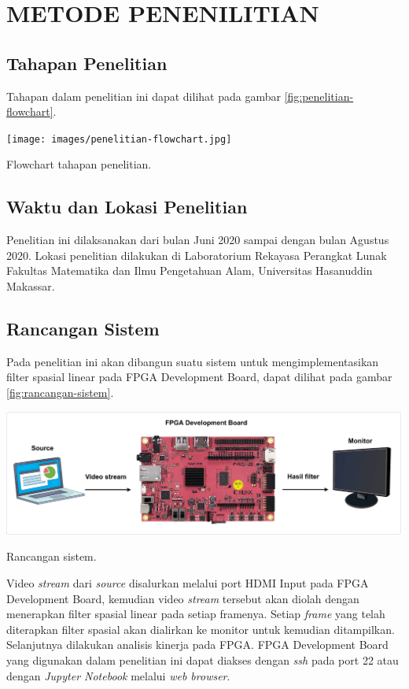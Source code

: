 
\chapter{METODE PENENILITIAN}


\section{Tahapan Penelitian}
Tahapan dalam penelitian ini dapat dilihat pada gambar \ref{fig:penelitian-flowchart}.
\begin{afigure}
    \texttt{[image: images/penelitian-flowchart.jpg]}
    \caption{Flowchart tahapan penelitian.}
    \label{fig:penelitian-flowchart}
\end{afigure}


\section{Waktu dan Lokasi Penelitian}
Penelitian ini dilaksanakan dari bulan Juni 2020 sampai dengan bulan Agustus 2020. Lokasi penelitian dilakukan di Laboratorium Rekayasa Perangkat Lunak Fakultas Matematika dan Ilmu Pengetahuan Alam, Universitas Hasanuddin Makassar.

\section{Rancangan Sistem}
Pada penelitian ini akan dibangun suatu sistem untuk mengimplementasikan filter spasial linear pada FPGA Development Board, dapat dilihat pada gambar \ref{fig:rancangan-sistem}.
\begin{afigure}
    \includegraphics[width=1\textwidth, center]{images/rancangan-sistem2.png}
    \caption{Rancangan sistem.}
    \label{fig:rancangan-sistem}
\end{afigure}

Video \textit{stream} dari \textit{source} disalurkan melalui port HDMI Input pada FPGA Development Board, kemudian video \textit{stream} tersebut akan diolah dengan menerapkan filter spasial linear pada setiap framenya. Setiap \textit{frame} yang telah diterapkan filter spasial akan dialirkan ke monitor untuk kemudian ditampilkan. Selanjutnya dilakukan analisis kinerja pada FPGA. FPGA Development Board yang digunakan dalam penelitian ini dapat diakses dengan \textit{ssh} pada port 22 atau dengan \textit{Jupyter Notebook} melalui \textit{web browser}.

